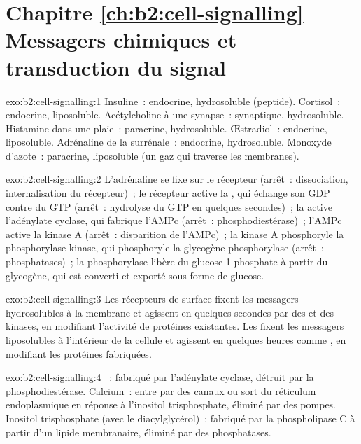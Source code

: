 \section*{Chapitre \ref{ch:b2:cell-signalling} --- Messagers chimiques et transduction du signal}

\begin{solution}{exo:b2:cell-signalling:1}
Insuline~: endocrine, hydrosoluble (peptide). Cortisol~: endocrine,
liposoluble. Acétylcholine à une synapse~: synaptique, hydrosoluble.
Histamine dans une plaie~: paracrine, hydrosoluble. Œstradiol~:
endocrine, liposoluble. Adrénaline de la surrénale~: endocrine,
hydrosoluble. Monoxyde d'azote~: paracrine, liposoluble (un gaz qui
traverse les membranes).
\end{solution}

\begin{solution}{exo:b2:cell-signalling:2}
L'adrénaline se fixe sur le récepteur (arrêt~: dissociation,
internalisation du récepteur)~; le récepteur active la , qui
échange son GDP contre du GTP (arrêt~: hydrolyse du GTP en quelques
secondes)~; la  active l'adénylate cyclase, qui fabrique
l'AMPc (arrêt~: phosphodiestérase)~; l'AMPc active la kinase A (arrêt~:
disparition de l'AMPc)~; la kinase A phosphoryle la phosphorylase
kinase, qui phosphoryle la glycogène phosphorylase (arrêt~:
phosphatases)~; la phosphorylase libère du glucose 1-phosphate à partir
du glycogène, qui est converti et exporté sous forme de glucose.
\end{solution}

\begin{solution}{exo:b2:cell-signalling:3}
Les récepteurs de surface fixent les messagers hydrosolubles à la
membrane et agissent en quelques secondes par des  et
des kinases, en modifiant l'activité de protéines existantes. Les
 fixent les messagers liposolubles à l'intérieur de
la cellule et agissent en quelques heures comme , en modifiant les protéines fabriquées.
\end{solution}

\begin{solution}{exo:b2:cell-signalling:4}
~: fabriqué par l'adénylate cyclase, détruit par la
phosphodiestérase. Calcium~: entre par des canaux ou sort du réticulum
endoplasmique en réponse à l'inositol trisphosphate, éliminé par des
pompes. Inositol trisphosphate (avec le diacylglycérol)~: fabriqué par
la phospholipase C à partir d'un lipide membranaire, éliminé par des
phosphatases.
\end{solution}

